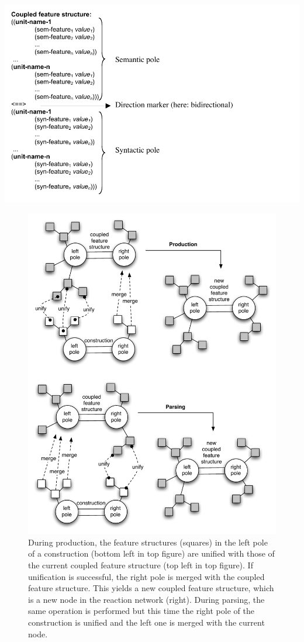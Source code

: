 \includegraphics[width=\linewidth]{Chapter2/figs/fcg-pattern}

\begin{figure}[p]
\centerline{\includegraphics[width=0.8\linewidth]{Chapter2/figs/unify}}
 \caption[Unifying and merging a construction]{During production, the feature structures (squares) in the left pole of a construction (bottom left in top figure) are unified with those of the current coupled feature structure (top left in top figure). If unification is successful, the right pole is merged with the coupled feature structure. This yields a new coupled feature structure, which is a new node in the reaction network (right). During parsing, the same operation is performed but this time the right pole of the construction is unified and the left one is merged with the current node.}
   \label{f:unify}
\end{figure}

